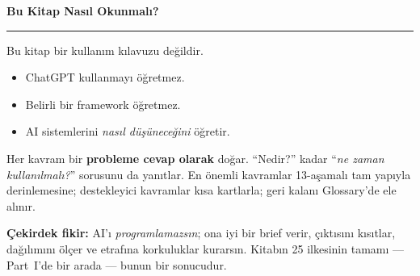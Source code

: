 \documentclass[11pt]{book}
\begin{document}
\tableofcontents

\clearpage
{}
\noindent{}\par
\vspace{4pt}
{\sffamily\bfseries\fontsize{26}{30}\selectfont Bu Kitap Nasıl Okunmalı?\par}
\vspace{2pt}\textcolor{accent}{\rule{40mm}{2.2pt}}\par
\vspace{10pt}

Bu kitap bir kullanım kılavuzu değildir.

\begin{itemize}
  \item[\textcolor{warn}{\ding{55}}] ChatGPT kullanmayı öğretmez.
  \item[\textcolor{warn}{\ding{55}}] Belirli bir framework öğretmez.
  \item[\textcolor{good}{\ding{51}}] AI sistemlerini \emph{nasıl düşüneceğini} öğretir.
\end{itemize}

Her kavram bir \textbf{probleme cevap olarak} doğar. ``Nedir?'' kadar
``\emph{ne zaman kullanılmalı?}'' sorusunu da yanıtlar. En önemli kavramlar
13-aşamalı tam yapıyla derinlemesine; destekleyici kavramlar kısa kartlarla;
geri kalanı Glossary'de ele alınır.


\vspace{6pt}
\begin{principlebox}
\textbf{Çekirdek fikir:} AI'ı \emph{programlamazsın}; ona iyi bir brief verir,
çıktısını kısıtlar, dağılımını ölçer ve etrafına korkuluklar kurarsın. Kitabın
25 ilkesinin tamamı --- Part~I'de bir arada --- bunun bir sonucudur.
\end{principlebox}

\mainmatter
\end{document}
